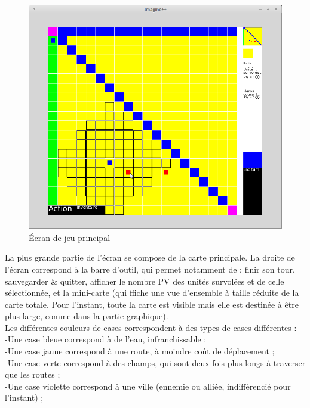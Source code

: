 \documentclass[11pt,a4paper]{article}
\begin{document}
\begin{figure}[h]
\begin{center}
\includegraphics[scale=0.5]{./ecran_de_gestion.png}
\caption{Écran de jeu principal}
\end{center}
\end{figure}

La plus grande partie de l'écran se compose de la carte principale. La droite de l'écran correspond à la barre d'outil, qui permet notamment de : finir son tour, sauvegarder \& quitter, afficher le nombre PV des unités survolées et de celle sélectionnée, et la mini-carte (qui ffiche une vue d'ensemble à taille réduite de la carte totale. Pour l'instant, toute la carte est visible mais elle est destinée à être plus large, comme dans la partie graphique). \\

Les différentes couleurs de cases correspondent à des types de cases différentes : \\
-Une case bleue correspond à de l'eau, infranchissable ;\\
-Une case jaune correspond à une route, à moindre coût de déplacement ;\\
-Une case verte correspond à des champs, qui sont deux fois plus longs à traverser que les routes ;\\
-Une case violette correspond à une ville (ennemie ou alliée, indifférencié pour l'instant) ;\\
\end{document}
